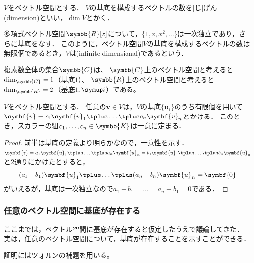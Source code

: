 \documentclass[../sotsu.tex]{subfiles}
\begin{document}
\begin{definition}[次元]
    \label{dfn:dimension}
    $V$をベクトル空間とする．
    $V$の基底を構成するベクトルの数を[じ|げん](dimension)といい，$\dim V$とかく．
\end{definition}

\begin{example}
    多項式ベクトル空間$\symbb{R}[x]$について，$\{ 1, x, x^2, \dotsc \}$は一次独立であり，さらに基底をなす．
    このように，ベクトル空間$V$の基底を構成するベクトルの数は無限個であるとき，$V$は(infinite dimensional)であるという．
\end{example}

\begin{example}
    複素数全体の集合$\symbb{C}$は、
    $\symbb{C}$上のベクトル空間と考えると$\dim_{\symbb{C}} = 1$（基底$1$）、
    $\symbb{R}$上のベクトル空間と考えると$\dim_{\symbb{R}} = 2$（基底$1, \iu$）である。
\end{example}


\begin{corollary}[基底によるベクトルの展開]
    \label{thm:coordinates-by-basis}
    $V$をベクトル空間とする．
    任意の$\symbf{v} \in V$は，$V$の基底$ \{ \symbf{u}_i \} $のうち有限個を用いて$\symbf{v} = c_1 \symbf{v}_1 \vecplus \dots \vecplus c_n \symbf{v}_n$とかける．
    このとき，スカラーの組$c_1, \dots, c_n \in \symbb{K}$は一意に定まる．
\end{corollary}

\begin{proof}
    前半は基底の定義より明らかなので，一意性を示す．
    $\symbf{v} = a_1 \symbf{u}_1 \vecplus \dots \vecplus a_n \symbf{u}_n = b_1 \symbf{u}_1 \vecplus \dots \vecplus b_n \symbf{u}_n$と2通りにかけたとすると，
    \begin{equation*}
        (a_1 \! - b_1) \symbf{u}_1 \vecplus \dots \vecplus (a_n \! - b_n) \symbf{u}_n = \symbf{0}
    \end{equation*}
    がいえるが，基底は一次独立なので$a_1 \! - b_1 = \dots = a_n \! - b_1 = 0$である．
\end{proof}



\subsubsection{任意のベクトル空間に基底が存在する}

ここまでは，ベクトル空間に基底が存在すると仮定したうえで議論してきた．
実は，任意のベクトル空間について，基底が存在することを示すことができる．

証明にはツォルンの補題を用いる。
\end{document}
